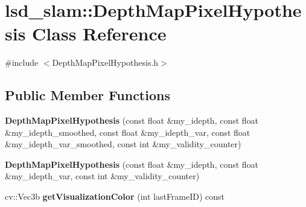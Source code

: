 \hypertarget{classlsd__slam_1_1_depth_map_pixel_hypothesis}{\section{lsd\-\_\-slam\-:\-:Depth\-Map\-Pixel\-Hypothesis Class Reference}
\label{classlsd__slam_1_1_depth_map_pixel_hypothesis}
}


{\ttfamily \#include $<$Depth\-Map\-Pixel\-Hypothesis.\-h$>$}

\subsection*{Public Member Functions}
\begin{DoxyCompactItemize}
\item 
\hypertarget{classlsd__slam_1_1_depth_map_pixel_hypothesis_ab44f3294848f98ba98230e7a32df3966}{{\bfseries Depth\-Map\-Pixel\-Hypothesis} (const float \&my\-\_\-idepth, const float \&my\-\_\-idepth\-\_\-smoothed, const float \&my\-\_\-idepth\-\_\-var, const float \&my\-\_\-idepth\-\_\-var\-\_\-smoothed, const int \&my\-\_\-validity\-\_\-counter)}\label{classlsd__slam_1_1_depth_map_pixel_hypothesis_ab44f3294848f98ba98230e7a32df3966}

\item 
\hypertarget{classlsd__slam_1_1_depth_map_pixel_hypothesis_a5e6aa51c8e45df411b28b639bdb5e522}{{\bfseries Depth\-Map\-Pixel\-Hypothesis} (const float \&my\-\_\-idepth, const float \&my\-\_\-idepth\-\_\-var, const int \&my\-\_\-validity\-\_\-counter)}\label{classlsd__slam_1_1_depth_map_pixel_hypothesis_a5e6aa51c8e45df411b28b639bdb5e522}

\item 
\hypertarget{classlsd__slam_1_1_depth_map_pixel_hypothesis_ad59c8017a906e51e3ab3b104b68da64b}{cv\-::\-Vec3b {\bfseries get\-Visualization\-Color} (int last\-Frame\-I\-D) const }\label{classlsd__slam_1_1_depth_map_pixel_hypothesis_ad59c8017a906e51e3ab3b104b68da64b}

\end{DoxyCompactItemize}
